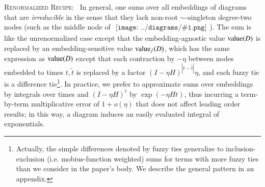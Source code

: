 \documentclass{article}
\newcommand{\dvalue}{\text{\textnormal{value}}}
\newcommand{\wabs}[1]{\left|#1\right|}
\newcommand{\sdia}[1]{\begin{gathered}\texttt{[image: ../diagrams/\#1.png]}\end{gathered}}
\begin{document}
        \textsc{Renormalized Recipe:}~
        In general, one sums over all embeddings of diagrams that are
        \emph{irreducible} in the sense that they lack non-root
        $\sim$-singleton degree-two nodes (such as the middle node of
        $\sdia{(0-1-2)(01-12)}$).  The sum is like the unrenormalized case
        except that the embedding-agnostic value $\dvalue(D)$ is replaced by an
        embedding-sensitive value $\dvalue_f(D)$, which has the same expression
        as $\dvalue(D)$ except that each contraction by $-\eta$ between nodes
        embedded to times $t, \tilde t$ is replaced by a factor $(I-\eta
        H)^{\wabs{t-\tilde t}} \eta$, and each fuzzy tie is a difference
        tie\footnote{
            Actually, the simple differences denoted by fuzzy ties generalize
            to inclusion-exclusion (i.e. mobius-function weighted) sums for
            terms with more fuzzy ties than we consider in the paper's body.
            We describe the general pattern in an appendix. 
        }.
        In practice, we prefer to approximate sums over embeddings by integrals
        over times and $(I-\eta H)^t$ by $\exp(- \eta H t)$, thus incurring a
        term-by-term multiplicative error of $1 + o(\eta)$ that does not affect
        leading order results; in this way, a diagram induces an easily
        evaluated integral of exponentials.
       
\end{document}
